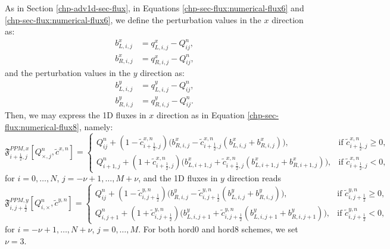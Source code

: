 As in Section \ref{chp-adv1d-sec-flux}, 
in Equations \eqref{chp-sec-flux:numerical-flux6} and \eqref{chp-sec-flux:numerical-flux6}, 
we define the perturbation values in the $x$ direction as:
\begin{align}
\label{chp-adv2d-pertb-xL}
b_{L,i,j}^x &= q_{L,i,j}^x - Q_{ij}^n, \\
\label{chp-adv2d-pertb-xR}
b_{R,i,j}^x &= q_{R,i,j}^x - Q_{ij}^n,
\end{align}
and the perturbation values in the $y$ direction as:
\begin{align}
\label{chp-adv2d-pertb-yL}
b_{L,i,j}^y &= q_{L,i,j}^y - Q_{ij}^n, \\
\label{chp-adv2d-pertb-yR}
b_{R,i,j}^y &= q_{R,i,j}^y - Q_{ij}^n.
\end{align}
Then, we may express the 1D fluxes in $x$ direction as in Equation \eqref{chp-sec-flux:numerical-flux8}, namely:
\begin{equation}
	\label{chp-adv2d-flux-xdir}
        \mathfrak{F}_{i+\frac{1}{2},j}^{PPM,x}[Q_{\times,j}^n,\tilde{c}^{x,n}]  =  
    	\begin{cases}
        Q_{ij}^n +
        (1-\tilde{c}_{{i+\frac{1}{2},j}}^{x,n})
        \big(b_{R,i,j}^x-\tilde{c}_{{i+\frac{1}{2},j}}^{x,n}
        (b_{L,i,j}^x+b_{R,i,j}^x)\big),
	& \text{if } \tilde{c}_{i+\frac{1}{2},j}^{x,n} \geq 0,\\
	Q_{i+1,j}^n +
        (1+\tilde{c}_{{i+\frac{1}{2},j}}^{x,n})
        \big(b_{L,i+1,j}^x+\tilde{c}_{{i+\frac{1}{2},j}}^{x,n}
        (b_{L,i+1,j}^x+b_{R,i+1,j}^x)\big),
	& \text{if } \tilde{c}_{i+\frac{1}{2},j}^{x,n}<0,
    	\end{cases}
\end{equation}
for $i=0, \ldots, N$, $j=-\nu+1, \ldots, M + \nu$, and the 1D fluxes in $y$ direction reads
\begin{equation}
	\label{chp-adv2d-flux-ydir}
        \mathfrak{F}_{i,j+\frac{1}{2}}^{PPM,y}[Q_{i,\times}^n,\tilde{c}^{y,n}]  =  
    	\begin{cases}
        Q_{ij}^n +
        (1-\tilde{c}_{{i,j+\frac{1}{2}}}^{y,n})
        \big(b_{R,i,j}^y-\tilde{c}_{{i,j+\frac{1}{2}}}^{y,n}
        (b_{L,i,j}^y+b_{R,i,j}^y)\big),
	& \text{if } \tilde{c}_{i,j+\frac{1}{2}}^{y,n} \geq 0,\\
	Q_{i,j+1}^n +
        (1+\tilde{c}_{{i,j+\frac{1}{2}}}^{y,n})
        \big(b_{L,i,j+1}^y+\tilde{c}_{{i,j+\frac{1}{2}}}^{y,n}
        (b_{L,i,j+1}^y+b_{R,i,j+1}^y)\big),
	& \text{if } \tilde{c}_{i,j+\frac{1}{2}}^{y,n}<0,
    	\end{cases}
\end{equation}
for $i=-\nu+1, \ldots, N + \nu$, $j=0, \ldots, M$.
For both hord0 and hord8 schemes, we set $\nu=3$.

